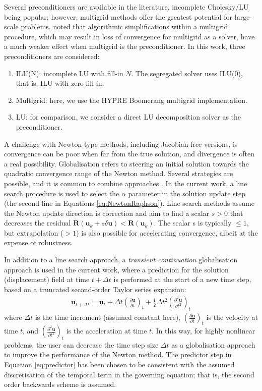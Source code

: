 \documentclass[sn-mathphys,Numbered]{sn-jnl}%
\newcommand{\bb}{\boldsymbol}
\begin{document}
Several preconditioners are available in the literature, incomplete Cholesky/LU being popular; however, multigrid methods offer the greatest potential for large-scale problems.
\citet{Knoll2004} noted that algorithmic simplifications within a multigrid procedure, which may result in loss of convergence for multigrid as a solver, have a much weaker effect when multigrid is the preconditioner.
In this work, three preconditioners are considered:
\begin{enumerate}
	\item ILU(N): incomplete LU with fill-in $N$. The segregated solver uses ILU(0), that is, ILU with zero fill-in.
	\item Multigrid: here, we use the HYPRE Boomerang multigrid implementation.
	\item LU: for comparison, we consider a direct LU decomposition solver as the preconditioner.
\end{enumerate}


A challenge with Newton-type methods, including Jacobian-free versions, is convergence can be poor when far from the true solution, and divergence is often a real possibility.
Globalisation refers to steering an initial solution towards the quadratic convergence range of the Newton method.
Several strategies are possible, and it is common to combine approaches \cite{Knoell2004}.
In the current work, a line search procedure is used to select the $\alpha$ parameter in the solution update step (the second line in Equations \ref{eq:NewtonRaphson}).
Line search methods assume the Newton update direction is correction and aim to find a scalar $s > 0$ that decreases the residual $\bb{R}(\bb{u}_k + s \delta \bb{u}) < \bb{R}(\bb{u}_k)$.
The scalar s is typically $\leq 1$, but extrapolation ($>1$) is also possible for accelerating convergence, albeit at the expense of robustness.

In addition to a line search approach, a \emph{transient continuation} globalisation approach is used in the current work, where a prediction for the solution (displacement) field at time $t + \Delta t$ is performed at the start of a new time step, based on a truncated second-order Taylor series expansion:
\begin{eqnarray} \label{eq:predictor}
	\bb{u}_{t+\Delta t} = \bb{u}_t + \Delta t \left(\frac{\partial \bb{u}}{\partial t}\right)_t + \frac{1}{2} \Delta t^2 \left( \frac{\partial^2 \bb{u}}{\partial t^2} \right)_t
\end{eqnarray}
where $\Delta t$ is the time increment (assumed constant here), $\left(\frac{\partial \bb{u}}{\partial t}\right)_t$ is the velocity at time $t$, and $\left( \frac{\partial^2 \bb{u}}{\partial t^2} \right)_t$ is the acceleration at time $t$.
In this way, for highly nonlinear problems, the user can decrease the time step size $\Delta t$ as a globalisation approach to improve the performance of the Newton method.
The predictor step in Equation \ref{eq:predictor} has been chosen to be consistent with the assumed discretisation of the temporal term in the governing equation; that is, the second order backwards scheme is assumed.
\end{document}
